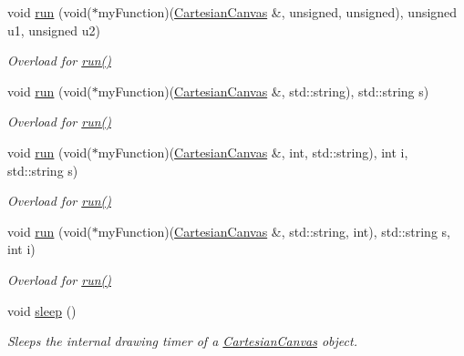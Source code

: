 \begin{DoxyCompactItemize}
void \hyperlink{classtsgl_1_1_cartesian_canvas_a3351ccc624bb154dc910cafd9effe3cd}{run} (void($\ast$my\+Function)(\hyperlink{classtsgl_1_1_cartesian_canvas}{Cartesian\+Canvas} \&, unsigned, unsigned), unsigned u1, unsigned u2)
\begin{DoxyCompactList}\small\item\em Overload for \hyperlink{classtsgl_1_1_cartesian_canvas_a63a948af53582b713957b872a765dcdb}{run()} \end{DoxyCompactList}\item 
void \hyperlink{classtsgl_1_1_cartesian_canvas_a7d76ab9f68d8ce7f76b6be20305a5e95}{run} (void($\ast$my\+Function)(\hyperlink{classtsgl_1_1_cartesian_canvas}{Cartesian\+Canvas} \&, std\+::string), std\+::string s)
\begin{DoxyCompactList}\small\item\em Overload for \hyperlink{classtsgl_1_1_cartesian_canvas_a63a948af53582b713957b872a765dcdb}{run()} \end{DoxyCompactList}\item 
void \hyperlink{classtsgl_1_1_cartesian_canvas_ab0bce76883df5ae48e368a7b7835aefd}{run} (void($\ast$my\+Function)(\hyperlink{classtsgl_1_1_cartesian_canvas}{Cartesian\+Canvas} \&, int, std\+::string), int i, std\+::string s)
\begin{DoxyCompactList}\small\item\em Overload for \hyperlink{classtsgl_1_1_cartesian_canvas_a63a948af53582b713957b872a765dcdb}{run()} \end{DoxyCompactList}\item 
void \hyperlink{classtsgl_1_1_cartesian_canvas_abf52fc46a6fdca1410db6feb3c67a3cd}{run} (void($\ast$my\+Function)(\hyperlink{classtsgl_1_1_cartesian_canvas}{Cartesian\+Canvas} \&, std\+::string, int), std\+::string s, int i)
\begin{DoxyCompactList}\small\item\em Overload for \hyperlink{classtsgl_1_1_cartesian_canvas_a63a948af53582b713957b872a765dcdb}{run()} \end{DoxyCompactList}\item 
void \hyperlink{classtsgl_1_1_cartesian_canvas_a3ae99570b9a5f68f4ccf31593867edb0}{sleep} ()
\begin{DoxyCompactList}\small\item\em Sleeps the internal drawing timer of a \hyperlink{classtsgl_1_1_cartesian_canvas}{Cartesian\+Canvas} object. \end{DoxyCompactList}\item 

\end{DoxyCompactItemize}
